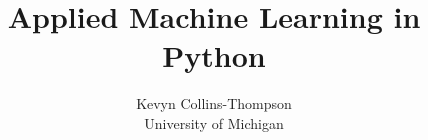 \documentclass[a4paper,11pt]{article} %
\author{Kevyn Collins-Thompson\\University of Michigan}
\title{Applied Machine Learning in Python}
\date{}
\begin{document}

\maketitle

\tableofcontents


\pagebreak


 



















































\end{document}
